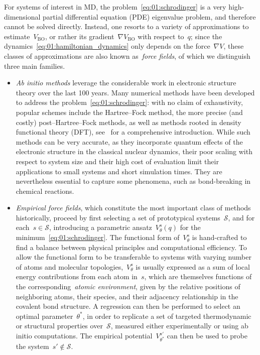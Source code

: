 For systems of interest in MD, the problem~\eqref{eq:01:schrodinger} is a very high-dimensional partial differential equation (PDE) eigenvalue problem, and therefore cannot be solved directly. Instead, one resorts to a variety of approximations to estimate~$V_{\mathrm{BO}}$, or rather its gradient~$\nabla V_{\mathrm{BO}}$ with respect to~$q$; since the dynamics~\eqref{eq:01:hamiltonian_dynamics} only depends on the force~$\nabla V$, these classes of approximations are also known as~\textit{force fields}, of which we distinguish three main families.
\begin{itemize}
    \item{\textit{Ab initio methods} leverage the considerable work in electronic structure theory over the last 100 years. Many numerical methods have been developed to address the problem~\eqref{eq:01:schrodinger}: with no claim of exhaustivity, popular schemes include the Hartree--Fock method, the more precise (and costly) post--Hartree--Fock methods, as well as methods rooted in density functional theory (DFT), see~\cite{J99} for a comprehensive introduction. While such methods can be very accurate, as they incorporate quantum effects of the electronic structure in the classical nuclear dynamics, their poor scaling with respect to system size and their high cost of evaluation limit their applications to small systems and short simulation times. They are nevertheless essential to capture some phenomena, such as bond-breaking in chemical reactions.}
    \item{\textit{Empirical force fields}, which constitute the most important class of methods historically, proceed by first selecting a set of prototypical systems~$\mathcal S$, and for each~$s\in\mathcal S$, introducing a parametric ansatz~$V^{s}_\theta(q)$ for the minimum~\eqref{eq:01:schrodinger}. The functional form of~$V^s_\theta$ is hand-crafted to find a balance between physical principles and computational efficiency. To allow the functional form to be transferable to systems with varying number of atoms and molecular topologies,~$V^s_\theta$ is usually expressed as a sum of local energy contributions from each atom in~$s$, which are themselves functions of the corresponding~\textit{atomic environment}, given by the relative positions of neighboring atoms, their species, and their adjacency relationship in the covalent bond structure. A regression can then be performed to select an optimal parameter~$\theta^*$, in order to replicate a set of targeted thermodynamic or structural properties over~$\mathcal S$, measured either experimentally or using ab initio computations. The empirical potential~$V_{\theta^*}^{s'}$ can then be used to probe the system~$s'\not\in\mathcal S$.
}
\end{itemize}
